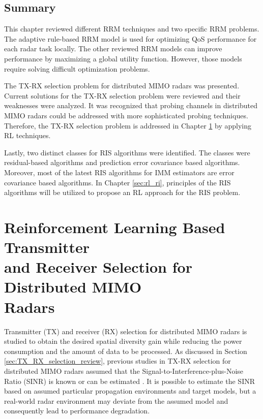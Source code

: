 \documentclass[english, 12pt, a4paper, elec, utf8, a-1b, online]{aaltothesis}
\numberwithin{equation}{section}
\begin{document}
\subsection{Summary}

This chapter reviewed different RRM techniques and two specific RRM problems.
The adaptive rule-based RRM model is used for optimizing QoS performance for each radar task locally.
The other reviewed RRM models can improve performance by maximizing a global utility function.
However, those models require solving difficult optimization problems.

The TX-RX selection problem for distributed MIMO radars was presented.
Current solutions for the TX-RX selection problem were reviewed and their weaknesses were analyzed.
It was recognized that probing channels in distributed MIMO radars could be addressed with more sophisticated probing techniques.
Therefore, the TX-RX selection problem is addressed in Chapter \ref{sec:RL_TX_RX} by applying RL techniques.

Lastly, two distinct classes for RIS algorithms were identified. 
The classes were residual-based algorithms and prediction error covariance based algorithms.
Moreover, most of the latest RIS algorithms for IMM estimators are error covariance based algorithms.
In Chapter \ref{sec:rl_ri}, principles of the RIS algorithms will be utilized to propose an RL approach for the RIS problem.


\newpage
\section[Reinforcement Learning Based Transmitter and Receiver Selection for Distributed MIMO Radars]{Reinforcement Learning Based Transmitter \\
and Receiver Selection for Distributed MIMO \\ Radars}\label{sec:RL_TX_RX}

Transmitter (TX) and receiver (RX) selection for distributed MIMO radars is studied to obtain the desired spatial diversity gain while reducing the power consumption and the amount of data to be processed.
As discussed in Section \ref{sec:TX_RX_selection_review}, previous studies in TX-RX selection for distributed MIMO radars assumed that the Signal-to-Interference-plus-Noise Ratio (SINR) is known \cite{Sun2014} or can be estimated \cite{Godrich2011a, Godrich2011}.
It is possible to estimate the SINR based on assumed particular propagation environments and target models, but a real-world radar environment may deviate from the assumed model and consequently lead to performance degradation.
\end{document}
